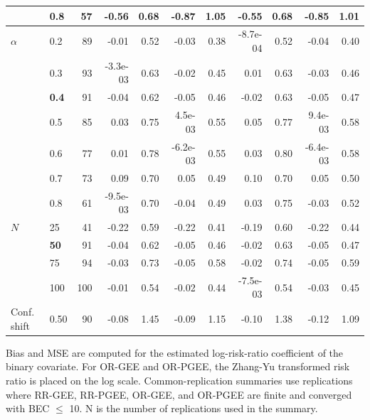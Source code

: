 \begin{table}[htbp]
\begin{tabular}{ll|rrr|rr|rr|rr}
 & 0.8 & 57 & -0.56 & 0.68 & -0.87 & 1.05 & -0.55 & 0.68 & -0.85 & 1.01 \\
\hline
$\alpha$ & 0.2 & 89 & -0.01 & 0.52 & -0.03 & 0.38 & -8.7e-04 & 0.52 & -0.04 & 0.40 \\
 & 0.3 & 93 & -3.3e-03 & 0.63 & -0.02 & 0.45 & 0.01 & 0.63 & -0.03 & 0.46 \\
 & \textbf{0.4} & 91 & -0.04 & 0.62 & -0.05 & 0.46 & -0.02 & 0.63 & -0.05 & 0.47 \\
 & 0.5 & 85 & 0.03 & 0.75 & 4.5e-03 & 0.55 & 0.05 & 0.77 & 9.4e-03 & 0.58 \\
 & 0.6 & 77 & 0.01 & 0.78 & -6.2e-03 & 0.55 & 0.03 & 0.80 & -6.4e-03 & 0.58 \\
 & 0.7 & 73 & 0.09 & 0.70 & 0.05 & 0.49 & 0.10 & 0.70 & 0.05 & 0.50 \\
 & 0.8 & 61 & -9.5e-03 & 0.70 & -0.04 & 0.49 & 0.03 & 0.75 & -0.03 & 0.52 \\
\hline
$N$ & 25 & 41 & -0.22 & 0.59 & -0.22 & 0.41 & -0.19 & 0.60 & -0.22 & 0.44 \\
 & \textbf{50} & 91 & -0.04 & 0.62 & -0.05 & 0.46 & -0.02 & 0.63 & -0.05 & 0.47 \\
 & 75 & 94 & -0.03 & 0.73 & -0.05 & 0.58 & -0.02 & 0.74 & -0.05 & 0.59 \\
 & 100 & 100 & -0.01 & 0.54 & -0.02 & 0.44 & -7.5e-03 & 0.54 & -0.03 & 0.45 \\
\hline
Conf. shift & 0.50 & 90 & -0.08 & 1.45 & -0.09 & 1.15 & -0.10 & 1.38 & -0.12 & 1.09 \\
\hline
\end{tabular}
\begin{flushleft}
\footnotesize Bias and MSE are computed for the estimated log-risk-ratio coefficient of the binary covariate. For OR-GEE and OR-PGEE, the Zhang-Yu transformed risk ratio is placed on the log scale. Common-replication summaries use replications where RR-GEE, RR-PGEE, OR-GEE, and OR-PGEE are finite and converged with BEC $\leq$ 10. N is the number of replications used in the summary.
\end{flushleft}
\end{table}

